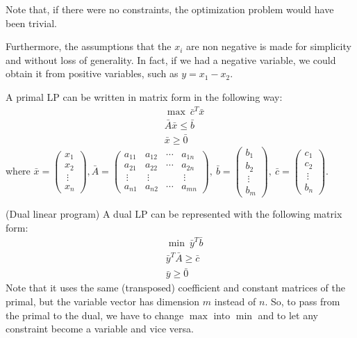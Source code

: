 Note that, if there were no constraints, the optimization problem would have been trivial.

Furthermore, the assumptions that the $x_i$ are non negative is made for simplicity and without loss of generality. In fact, if we had a negative variable, we could obtain it from positive variables, such as $y=x_1-x_2$.

A primal LP can be written in matrix form in the following way:
\begin{equation}
    \begin{aligned}\label{primal-matrix}
        &\max\ \bar{c}^T \bar{x}\\
        &\bar{A} \bar{x} \leq \bar{b}\\
        &\bar{x} \geq \bar{0}
    \end{aligned}
\end{equation}
where $\bar{x} =
\begin{pmatrix}
    x_1 \\ x_2 \\ \ \vdots \\ x_n
\end{pmatrix}, \bar{A} =
\begin{pmatrix}
    a_{11} & a_{12} & \cdots & a_{1n} \\
    a_{21} & a_{22} & \cdots & a_{2n} \\
    \ \vdots & \ \vdots &  & \ \vdots \\
    a_{n1} & a_{n2} & \cdots & a_{mn}
\end{pmatrix},\ \bar{b} =
\begin{pmatrix}
    b_1 \\ b_2 \\ \ \vdots \\ b_m
\end{pmatrix},\ \bar{c} =
\begin{pmatrix}
    c_1 \\ c_2 \\ \ \vdots \\ b_n
\end{pmatrix}$.

\begin{defn}(Dual linear program)\label{dual}
    A dual LP can be represented with the following matrix form:
    \begin{equation}
        \begin{aligned}\label{dual-matrix}
            &\min\ \bar{y}^T \bar{b}\\
            &\bar{y}^T\bar{A} \geq \bar{c}\\
            &\bar{y} \geq \bar{0}
        \end{aligned}
    \end{equation}
    Note that it uses the same (transposed) coefficient and constant matrices of the primal, but the variable vector has dimension $m$ instead of $n$. So, to pass from the primal to the dual, we have to change $\max$ into $\min$ and to let any constraint become a variable and vice versa.
\end{defn}

